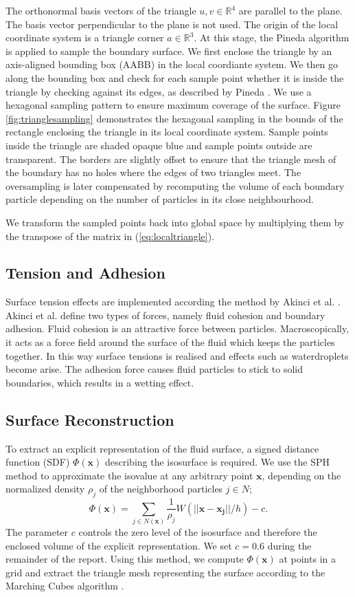 \documentclass[11pt, letterpaper, twocolumn]{article}
\begin{document}
The orthonormal basis vectors of the triangle \(u, v \in \mathbb{R}^4\) are parallel to the plane. The basis vector perpendicular to the plane is not used. The origin of the local coordinate system is a triangle corner \(a \in \mathbb{R}^3\).
At this stage, the Pineda algorithm is applied to sample the boundary surface. We first enclose the triangle by an axis-aligned bounding box (AABB) in the local coordiante system.
We then go along the bounding box and check for each sample point whether it is inside the triangle by checking against its edges, as described by Pineda \cite{pineda1988}.
We use a hexagonal sampling pattern to ensure maximum coverage of the surface. Figure \ref{fig:trianglesampling} demonstrates the hexagonal sampling in the bounds of the rectangle enclosing the triangle in its local coordinate system. Sample points inside the triangle are shaded opaque blue and sample points outside are transparent. The borders are slightly offset to ensure that the triangle mesh of the boundary has no holes where the edges of two triangles meet.
The oversampling is later compensated by recomputing the volume of each boundary particle depending on the number of particles in its close neighbourhood.

We transform the sampled points back into global space by multiplying them by the transpose of the matrix in (\ref{eq:localtriangle}).

\subsection{Tension and Adhesion}
Surface tension effects are implemented according the method by Akinci et al. \cite{akinci2013}.
Akinci et al. define two types of forces, namely fluid cohesion and boundary adhesion. Fluid cohesion is an attractive force between particles. Macroscopically, it acts as a force field around the surface of the fluid which keeps the particles together. In this way surface tensions is realised and effects such as waterdroplets become arise. The adhesion force causes fluid particles to stick to solid boundaries, which results in a wetting effect.

\subsection{Surface Reconstruction}
To extract an explicit representation of the fluid surface, a signed distance function (SDF) \(\Phi(\mathbf{x}) \) describing the isosurface is required. We use the SPH method to approximate the isovalue at any arbitrary point \(\mathbf{x}\), depending on the normalized density \(\rho_j\) of the neighborhood particles \(j \in N\);
\begin{equation}
  \Phi(\mathbf{x})= \sum_{j \in N(\mathbf{x})}\frac{1}{\rho_j} W(||\mathbf{x} - \mathbf{x_j}|| / h) - c.
\end{equation}
The parameter \(c\) controls the zero level of the isosurface and therefore the enclosed volume of the explicit representation. We set \(c = 0.6\) during the remainder of the report. Using this method, we compute \(\Phi(\mathbf{x})\) at points in a grid and extract the triangle mesh representing the surface according to the Marching Cubes algorithm \cite{lorensen1987}.
\end{document}
